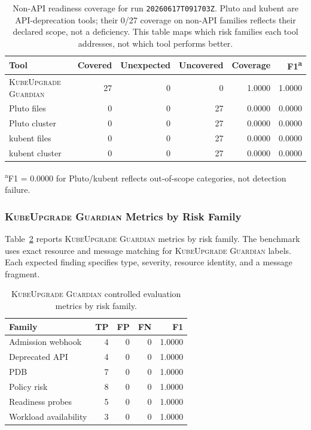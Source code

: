 \documentclass[10pt,journal]{IEEEtran}
\newcommand{\tool}{\textsc{KubeUpgrade Guardian}}
\newcommand{\code}[1]{\texttt{#1}}
\begin{document}
\begin{table}[t]
  \centering
  \caption{Non-API readiness coverage for run \code{20260617T091703Z}. Pluto and kubent are API-deprecation tools; their 0/27 coverage on non-API families reflects their declared scope, not a deficiency. This table maps which risk families each tool addresses, not which tool performs better.}
  \label{tab:non-api-coverage}
  \begin{tabular}{lrrrrr}
    \toprule
    Tool & Covered & Unexpected & Uncovered & Coverage & F1\textsuperscript{a} \\
    \midrule
    \tool{} & 27 & 0 & 0 & 1.0000 & 1.0000 \\
    Pluto files & 0 & 0 & 27 & 0.0000 & 0.0000 \\
    Pluto cluster & 0 & 0 & 27 & 0.0000 & 0.0000 \\
    kubent files & 0 & 0 & 27 & 0.0000 & 0.0000 \\
    kubent cluster & 0 & 0 & 27 & 0.0000 & 0.0000 \\
    \bottomrule
  \end{tabular}
  \vspace{0.25em}

  \footnotesize{\textsuperscript{a}F1 = 0.0000 for Pluto/kubent reflects out-of-scope categories, not detection failure.}
\end{table}

\subsubsection*{\tool{} Metrics by Risk Family}
Table~\ref{tab:controlled-family} reports \tool{} metrics by risk family. The benchmark uses exact resource and message matching for \tool{} labels. Each expected finding specifies type, severity, resource identity, and a message fragment.

\begin{table}[t]
  \centering
  \caption{\tool{} controlled evaluation metrics by risk family.}
  \label{tab:controlled-family}
  \begin{tabular}{lrrrr}
    \toprule
    Family & TP & FP & FN & F1 \\
    \midrule
    Admission webhook & 4 & 0 & 0 & 1.0000 \\
    Deprecated API & 4 & 0 & 0 & 1.0000 \\
    PDB & 7 & 0 & 0 & 1.0000 \\
    Policy risk & 8 & 0 & 0 & 1.0000 \\
    Readiness probes & 5 & 0 & 0 & 1.0000 \\
    Workload availability & 3 & 0 & 0 & 1.0000 \\
    \bottomrule
  \end{tabular}
\end{table}
\end{document}
